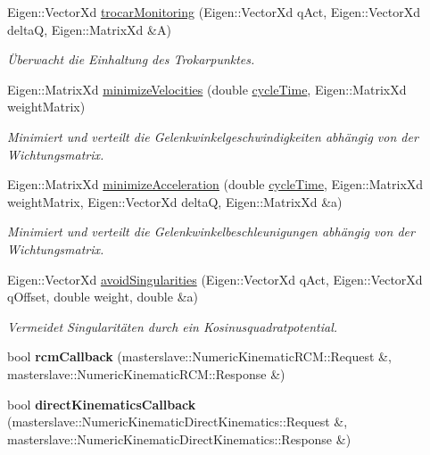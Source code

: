 \begin{DoxyCompactItemize}
\item 
Eigen\-::\-Vector\-Xd \hyperlink{classNumericKinematic_ae480557185cc99b324bae2769afd9faf}{trocar\-Monitoring} (Eigen\-::\-Vector\-Xd q\-Act, Eigen\-::\-Vector\-Xd delta\-Q, Eigen\-::\-Matrix\-Xd \&A)
\begin{DoxyCompactList}\small\item\em Überwacht die Einhaltung des Trokarpunktes. \end{DoxyCompactList}\item 
Eigen\-::\-Matrix\-Xd \hyperlink{classNumericKinematic_a2b570a6bd42d5ff63923b3779810d38c}{minimize\-Velocities} (double \hyperlink{classNumericKinematic_aa96fd840d44735dcf5af2a6007cdd9a5}{cycle\-Time}, Eigen\-::\-Matrix\-Xd weight\-Matrix)
\begin{DoxyCompactList}\small\item\em Minimiert und verteilt die Gelenkwinkelgeschwindigkeiten abhängig von der Wichtungsmatrix. \end{DoxyCompactList}\item 
Eigen\-::\-Matrix\-Xd \hyperlink{classNumericKinematic_ad6a2a0fc7fee25d1a536bdca40aad47c}{minimize\-Acceleration} (double \hyperlink{classNumericKinematic_aa96fd840d44735dcf5af2a6007cdd9a5}{cycle\-Time}, Eigen\-::\-Matrix\-Xd weight\-Matrix, Eigen\-::\-Vector\-Xd delta\-Q, Eigen\-::\-Matrix\-Xd \&a)
\begin{DoxyCompactList}\small\item\em Minimiert und verteilt die Gelenkwinkelbeschleunigungen abhängig von der Wichtungsmatrix. \end{DoxyCompactList}\item 
Eigen\-::\-Vector\-Xd \hyperlink{classNumericKinematic_a6b467211611418e500d58d0d8d172698}{avoid\-Singularities} (Eigen\-::\-Vector\-Xd q\-Act, Eigen\-::\-Vector\-Xd q\-Offset, double weight, double \&a)
\begin{DoxyCompactList}\small\item\em Vermeidet Singularitäten durch ein Kosinusquadratpotential. \end{DoxyCompactList}\item 
\hypertarget{classNumericKinematic_a95a6dfcf5c773c0a8e46befe21f86d18}{bool {\bfseries rcm\-Callback} (masterslave\-::\-Numeric\-Kinematic\-R\-C\-M\-::\-Request \&, masterslave\-::\-Numeric\-Kinematic\-R\-C\-M\-::\-Response \&)}\label{classNumericKinematic_a95a6dfcf5c773c0a8e46befe21f86d18}

\item 
\hypertarget{classNumericKinematic_adc3915a8772203f9c39a31a8869c4206}{bool {\bfseries direct\-Kinematics\-Callback} (masterslave\-::\-Numeric\-Kinematic\-Direct\-Kinematics\-::\-Request \&, masterslave\-::\-Numeric\-Kinematic\-Direct\-Kinematics\-::\-Response \&)}\label{classNumericKinematic_adc3915a8772203f9c39a31a8869c4206}


\end{DoxyCompactItemize}

